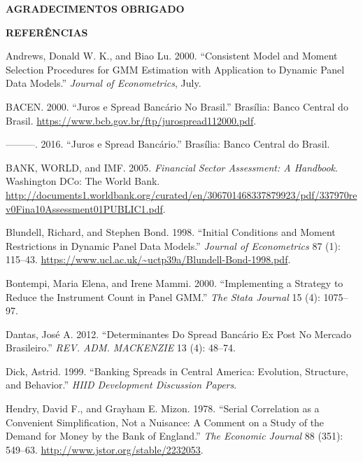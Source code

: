 \documentclass[
  ignorenonframetext,
  aspectratio=169,
  ignorenonframetext]{beamer}
\newlength{\cslhangindent}
\newenvironment{CSLReferences}[2] %
 {%
  \setlength{\parindent}{0pt}
  \ifodd #1 \everypar{\setlength{\hangindent}{\cslhangindent}}\ignorespaces\fi
  \ifnum #2 > 0
  \setlength{\parskip}{#2\baselineskip}
  \fi
 }%
 {}
\begin{document}
\begin{frame}{\textbf{AGRADECIMENTOS}}
\protect\hypertarget{agradecimentos}{}
\textbf{OBRIGADO}
\end{frame}

\begin{frame}{\textbf{REFERÊNCIAS}}
\protect\hypertarget{referuxeancias-23}{}
\hypertarget{refs}{}
\begin{CSLReferences}{1}{0}
\leavevmode{}%
Andrews, Donald W. K., and Biao Lu. 2000. {``Consistent Model and Moment
Selection Procedures for GMM Estimation with Application to Dynamic
Panel Data Models.''} \emph{Journal of Econometrics}, July.

\leavevmode{}%
BACEN. 2000. {``Juros e Spread Bancário No Brasil.''} Brasília: Banco
Central do Brasil.
\url{https://www.bcb.gov.br/ftp/jurospread112000.pdf}.

\leavevmode{}%
---------. 2016. {``Juros e Spread Bancário.''} Brasília: Banco Central
do Brasil.

\leavevmode{}%
BANK, WORLD, and IMF. 2005. \emph{Financial Sector Assessment: A
Handbook}. Washington DCo: The World Bank.
\url{http://documents1.worldbank.org/curated/en/306701468337879923/pdf/337970rev0Fina10Assessment01PUBLIC1.pdf}.

\leavevmode{}%
Blundell, Richard, and Stephen Bond. 1998. {``Initial Conditions and
Moment Restrictions in Dynamic Panel Data Models.''} \emph{Journal of
Econometrics} 87 (1): 115--43.
\url{https://www.ucl.ac.uk/~uctp39a/Blundell-Bond-1998.pdf}.

\leavevmode{}%
Bontempi, Maria Elena, and Irene Mammi. 2000. {``Implementing a Strategy
to Reduce the Instrument Count in Panel GMM.''} \emph{The Stata Journal}
15 (4): 1075--97.

\leavevmode{}%
Dantas, José A. 2012. {``Determinantes Do Spread Bancário Ex Post No
Mercado Brasileiro.''} \emph{REV. ADM. MACKENZIE} 13 (4): 48--74.

\leavevmode{}%
Dick, Astrid. 1999. {``Banking Spreads in Central America: Evolution,
Structure, and Behavior.''} \emph{HIID Development Discussion Papers}.

\leavevmode{}%
Hendry, David F., and Grayham E. Mizon. 1978. {``Serial Correlation as a
Convenient Simplification, Not a Nuisance: A Comment on a Study of the
Demand for Money by the Bank of England.''} \emph{The Economic Journal}
88 (351): 549--63. \url{http://www.jstor.org/stable/2232053}.


\end{CSLReferences}
\end{frame}
\end{document}
